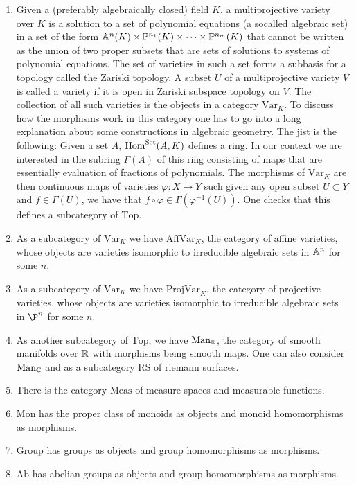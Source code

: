 \begin{example}
\begin{enumerate}
        \item Given a (preferably algebraically closed) field $K$, a multiprojective variety over $K$ is a solution to a set of polynomial equations (a socalled algebraic set) in a set of the form $\mathbb{A}^n(K)\times \mathbb{P}^{n_1}(K)\times \cdots \times \mathbb{P}^{n_m}(K)$ that cannot be written as the union of two proper subsets that are sets of solutions to systems of polynomial equations. The set of varieties in such a set forms a subbasis for a topology called the Zariski topology. A subset $U$ of a multiprojective variety $V$ is called a variety if it is open in Zariski subspace topology on $V$. The collection of all such varieties is the objects in a category $\mathrm{Var}_K$. To discuss how the morphisms work in this category one has to go into a long explanation about some constructions in algebraic geometry. The jist is the following: Given a set $A$, $\mathrm{Hom}^\mathrm{Set}(A,K)$ defines a ring. In our context we are interested in the subring $\Gamma(A)$ of this ring consisting of maps that are essentially evaluation of fractions of polynomials. The morphisms of $\mathrm{Var}_K$ are then continuous maps of varieties $\varphi: X\rightarrow Y$ such given any open subset $U\subset Y$ and $f\in \Gamma(U)$, we have that $f\circ \varphi \in \Gamma\left(\varphi^{-1}(U)\right)$. One checks that this defines a subcategory of $\mathrm{Top}$.
        \item As a subcategory of $\mathrm{Var}_K$ we have $\mathrm{AffVar}_K$, the category of affine varieties, whose objects are varieties isomorphic to irreducible algebraic sets in $\mathbb{A}^n$ for some $n$.
        \item As a subcategory of $\mathrm{Var}_K$ we have $\mathrm{ProjVar}_K$, the category of projective varieties, whose objects are varieties isomorphic to irreducible algebraic sets in $\P^n$ for some $n$.
        \item As another subcategory of $\mathrm{Top}$, we have $\mathrm{Man}_{\mathbb{R}}$, the category of smooth manifolds over $\mathbb{R}$ with morphisms being smooth maps. One can also consider $\mathrm{Man}_{\mathbb{C}}$ and as a subcategory $\mathrm{RS}$ of riemann surfaces.  
        \item There is the category $\mathrm{Meas}$ of measure spaces and measurable functions.
        \item $\mathrm{Mon}$ has the proper class of monoids as objects and monoid homomorphisms as morphisms.
        \item $\mathrm{Group}$ has groups as objects and group homomorphisms as morphisms.
        \item $\mathrm{Ab}$ has abelian groups as objects and group homomorphisms as morphisms.

\end{enumerate}
\end{example}
